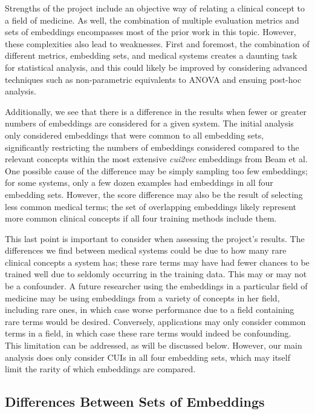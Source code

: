 \documentclass[10pt]{article}
\begin{document}
Strengths of the project include an objective way of relating a clinical concept to a field of medicine. As well, the combination of multiple evaluation metrics and sets of embeddings encompasses most of the prior work in this topic.  However, these complexities also lead to weaknesses. First and foremost, the combination of different metrics, embedding sets, and medical systems creates a daunting task for statistical analysis, and this could likely be improved by considering advanced techniques such as non-parametric equivalents to ANOVA and ensuing post-hoc analysis. 

Additionally, we see that there is a difference in the results when fewer or greater numbers of embeddings are considered for a given system. The initial analysis only considered embeddings that were common to all embedding sets, significantly restricting the numbers of embeddings considered compared to the relevant concepts within the most extensive \emph{cui2vec} embeddings from Beam et al. One possible cause of the difference may be simply sampling too few embeddings; for some systems, only a few dozen examples had embeddings in all four embedding sets. However, the score difference may also be the result of selecting less common medical terms; the set of overlapping embeddings likely represent more common clinical concepts if all four training methods include them. 

This last point is important to consider when assessing the project's results. The differences we find between medical systems could be due to how many rare clinical concepts a system has; these rare terms may have had fewer chances to be trained well due to seldomly occurring in the training data. This may or may not be a confounder. A future researcher using the embeddings in a particular field of medicine may be using embeddings from a variety of concepts in her field, including rare ones, in which case worse performance due to a field containing rare terms would be desired. Conversely, applications may only consider common terms in a field, in which case these rare terms would indeed be confounding. This limitation can be addressed, as will be discussed below. However, our main analysis does only consider CUIs in all four embedding sets, which may itself limit the rarity of which embeddings are compared. 

\subsection{Differences Between Sets of Embeddings}
\end{document}
